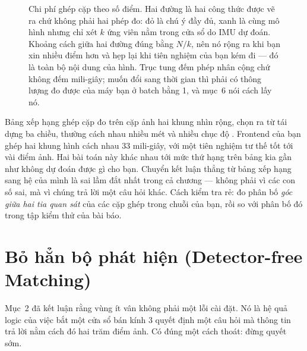 \documentclass[../../deep_learning.tex]{subfiles}
\begin{document}
\begin{figure}[H]\centering
{}
\caption{Chi phí ghép cặp theo số điểm. Hai đường là hai công thức được vẽ ra chứ không phải hai phép đo: đỏ là chú ý đầy đủ, xanh là cùng mô hình nhưng chỉ xét \(k\) ứng viên nằm trong cửa sổ do IMU dự đoán. Khoảng cách giữa hai đường đúng bằng \(N/k\), nên nó rộng ra khi bạn xin nhiều điểm hơn và hẹp lại khi tiên nghiệm của bạn kém đi --- đó là toàn bộ nội dung của hình. Trục tung đếm phép nhân cộng chứ không đếm mili-giây; muốn đổi sang thời gian thì phải có thông lượng đo được của máy bạn ở batch bằng 1, và mục~6 nói cách lấy nó.}
\label{fig:f28-chi-phi}
\end{figure}

\begin{cambay}
Bảng xếp hạng ghép cặp đo trên cặp ảnh hai khung nhìn rộng, chọn ra từ tái dựng ba chiều, thường cách nhau nhiều mét và nhiều chục độ \cite{jin2021imw}. Frontend của bạn ghép hai khung hình cách nhau 33 mili-giây, với một tiên nghiệm tư thế tốt tới vài điểm ảnh. Hai bài toán này khác nhau tới mức thứ hạng trên bảng kia gần như không dự đoán được gì cho bạn. Chuyển kết luận thẳng từ bảng xếp hạng sang hệ của mình là sai lầm đắt nhất trong cả chương --- không phải vì các con số sai, mà vì chúng trả lời một câu hỏi khác. Cách kiểm tra rẻ: đo phân bố \emph{góc giữa hai tia quan sát} của các cặp ghép trong chuỗi của bạn, rồi so với phân bố đó trong tập kiểm thử của bài báo.
\end{cambay}

\section{Bỏ hẳn bộ phát hiện (Detector-free Matching)}
Mục~2 đã kết luận rằng vùng ít vân không phải một lỗi cài đặt. Nó là hệ quả logic của việc bắt một cửa sổ bán kính 3 quyết định một câu hỏi mà thông tin trả lời nằm cách đó hai trăm điểm ảnh. Có đúng một cách thoát: đừng quyết sớm.
\end{document}
